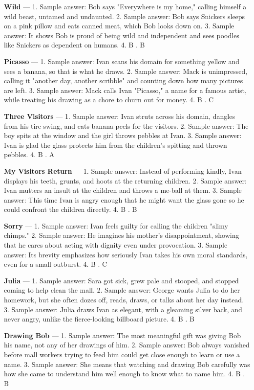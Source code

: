 \documentclass[11pt]{article}
\begin{document}
\noindent\textbf{Wild} --- 1. Sample answer: Bob says "Everywhere is my home," calling himself a wild beast, untamed and undaunted. 2. Sample answer: Bob says Snickers sleeps on a pink pillow and eats canned meat, which Bob looks down on. 3. Sample answer: It shows Bob is proud of being wild and independent and sees poodles like Snickers as dependent on humans. 4. B . B

\noindent\textbf{Picasso} --- 1. Sample answer: Ivan scans his domain for something yellow and sees a banana, so that is what he draws. 2. Sample answer: Mack is unimpressed, calling it "another day, another scribble" and counting down how many pictures are left. 3. Sample answer: Mack calls Ivan "Picasso," a name for a famous artist, while treating his drawing as a chore to churn out for money. 4. B . C

\noindent\textbf{Three Visitors} --- 1. Sample answer: Ivan struts across his domain, dangles from his tire swing, and eats banana peels for the visitors. 2. Sample answer: The boy spits at the window and the girl throws pebbles at Ivan. 3. Sample answer: Ivan is glad the glass protects him from the children's spitting and thrown pebbles. 4. B . A

\noindent\textbf{My Visitors Return} --- 1. Sample answer: Instead of performing kindly, Ivan displays his teeth, grunts, and hoots at the returning children. 2. Sample answer: Ivan mutters an insult at the children and throws a me-ball at them. 3. Sample answer: This time Ivan is angry enough that he might want the glass gone so he could confront the children directly. 4. B . B

\noindent\textbf{Sorry} --- 1. Sample answer: Ivan feels guilty for calling the children "slimy chimps." 2. Sample answer: He imagines his mother's disappointment, showing that he cares about acting with dignity even under provocation. 3. Sample answer: Its brevity emphasizes how seriously Ivan takes his own moral standards, even for a small outburst. 4. B . C

\noindent\textbf{Julia} --- 1. Sample answer: Sara got sick, grew pale and stooped, and stopped coming to help clean the mall. 2. Sample answer: George wants Julia to do her homework, but she often dozes off, reads, draws, or talks about her day instead. 3. Sample answer: Julia draws Ivan as elegant, with a gleaming silver back, and never angry, unlike the fierce-looking billboard picture. 4. B . B

\noindent\textbf{Drawing Bob} --- 1. Sample answer: The most meaningful gift was giving Bob his name, not any of her drawings of him. 2. Sample answer: Bob always vanished before mall workers trying to feed him could get close enough to learn or use a name. 3. Sample answer: She means that watching and drawing Bob carefully was how she came to understand him well enough to know what to name him. 4. B . B
\end{document}
